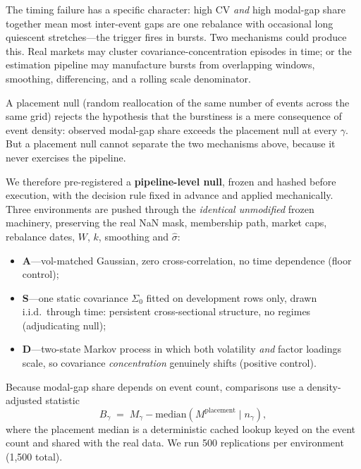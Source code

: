 \documentclass[12pt,letterpaper]{article}
\begin{document}
The timing failure has a specific character: high CV \emph{and} high modal-gap share
together mean most inter-event gaps are one rebalance with occasional long quiescent
stretches---the trigger fires in bursts. Two mechanisms could produce this. Real
markets may cluster covariance-concentration episodes in time; or the estimation
pipeline may manufacture bursts from overlapping windows, smoothing, differencing,
and a rolling scale denominator.

A placement null (random reallocation of the same number of events across the same
grid) rejects the hypothesis that the burstiness is a mere consequence of event
density: observed modal-gap share exceeds the placement null at every $\gamma$. But a
placement null cannot separate the two mechanisms above, because it never exercises
the pipeline.

We therefore pre-registered a \textbf{pipeline-level null}, frozen and hashed before execution, with the decision rule fixed in advance and applied mechanically. Three
environments are pushed through the \emph{identical unmodified} frozen machinery,
preserving the real NaN mask, membership path, market caps, rebalance dates, $W$,
$k$, smoothing and $\hat{\sigma}$:
\begin{itemize}
\item \textbf{A}---vol-matched Gaussian, zero cross-correlation, no time dependence
      (floor control);
\item \textbf{S}---one static covariance $\Sigma_0$ fitted on development rows only,
      drawn i.i.d.\ through time: persistent cross-sectional structure, no regimes
      (adjudicating null);
\item \textbf{D}---two-state Markov process in which both volatility \emph{and}
      factor loadings scale, so covariance \emph{concentration} genuinely shifts
      (positive control).
\end{itemize}

Because modal-gap share depends on event count, comparisons use a density-adjusted
statistic
\begin{equation}
B_\gamma \;=\; M_\gamma - \mathrm{median}\!\left(M^{\mathrm{placement}} \mid n_\gamma\right),
\label{eq:bgamma}
\end{equation}
where the placement median is a deterministic cached lookup keyed on the event count
and shared with the real data. We run 500 replications per environment (1{,}500
total).
\end{document}
